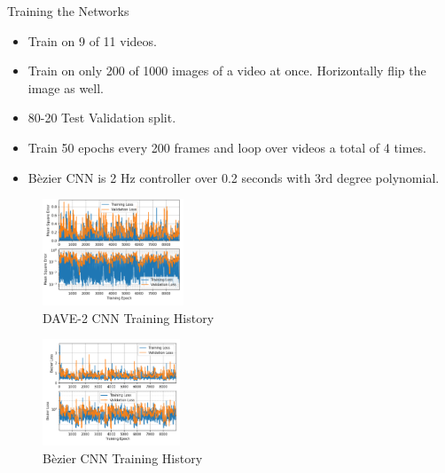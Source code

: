 \documentclass[aspectratio=169,xcolor=dvipsnames]{beamer}
\begin{document}
\begin{frame}{Training the Networks}
    \begin{itemize}
        \item Train on 9 of 11 videos.
        \item Train on only 200 of 1000 images of a video at once. Horizontally flip the image as well.
        \item 80-20 Test Validation split.
        \item Train 50 epochs every 200 frames and loop over videos a total of 4 times.
        \item B\`ezier CNN is 2 Hz controller over 0.2 seconds with 3rd degree polynomial.
    \end{itemize}

\begin{multicols}{2}

\begin{figure}[hbt]
    \centering
    \includegraphics[height=1.25in, trim= 0in 0.25in 0in 0.0in, clip]{../figures/presentation/cnn-training-history.PNG}
    \caption{DAVE-2 CNN Training History}
    \label{fig:cnn-th}
\end{figure}

\columnbreak

\begin{figure}[hbt]
    \centering
    \includegraphics[height=1.25in, trim= 0in 0.25in 0in 0.0in, clip]{../figures/presentation/bezier-training-history.PNG}
    \caption{B\`ezier CNN Training History}
    \label{fig:bcnn-th}
\end{figure}

\end{multicols}    

\end{frame}
\end{document}
